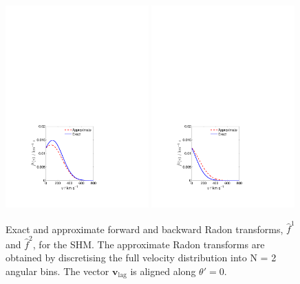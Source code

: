 \begin{figure}[ht!]

  \centering
  \includegraphics[trim={3.5cm 2cm 7.5cm 17cm},clip,width=0.49\textwidth]{Directional/SHM_N2_1.pdf}
  \includegraphics[trim={3.5cm 2cm 7.5cm 17cm},clip,width=0.49\textwidth]{Directional/SHM_N2_2.pdf}

\caption[Exact and approximate integrated Radon transforms for $N=2$ components in the SHM]{Exact and approximate forward and backward Radon transforms, $\hat{f}^1$ and $\hat{f}^2$, for the SHM. The approximate Radon transforms are obtained by discretising the full velocity distribution into N = 2 angular bins. The vector $\textbf{v}_\textrm{lag}$ is aligned along $\theta' = 0$.}
\label{fig:directional:radonN2_SHM}
\end{figure}

